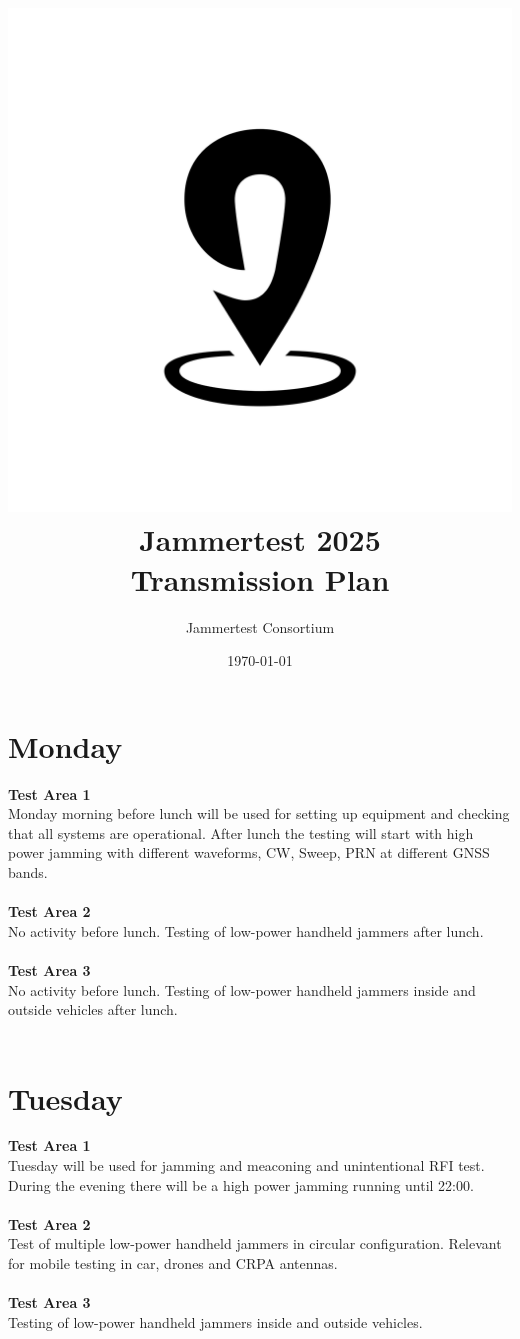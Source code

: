 \documentclass[a4paper]{book}
\title{\includegraphics[scale=0.2]{graphics/jampin.png}\\ Jammertest 2025 \\ \huge{Transmission Plan}}
\author{Jammertest Consortium}
\date{\today \\ \DTMcurrenttime}
\begin{document}
\maketitle

\tableofcontents
\restoregeometry

\begin{landscape}

\chapter{Monday}
\Large \textbf{Test Area 1} \\
Monday morning before lunch will be used for setting up equipment and checking that all systems are operational. After lunch the testing will start with high power jamming with different waveforms, CW, Sweep, PRN at different GNSS bands.\\ \\
\Large \textbf{Test Area 2} \\
No activity before lunch. Testing of low-power handheld jammers after lunch.\\ \\
\Large \textbf{Test Area 3} \\
No activity before lunch. Testing of low-power handheld jammers inside and outside vehicles after lunch.\\ \\

%

\chapter{Tuesday}
\Large \textbf{Test Area 1} \\
Tuesday will be used for jamming and meaconing and unintentional RFI test. During the evening there will be a high power jamming running until 22:00.\\ \\
\Large \textbf{Test Area 2} \\ 
Test of multiple low-power handheld jammers in circular configuration. Relevant for mobile testing in car, drones and CRPA antennas.\\ \\ 
\Large \textbf{Test Area 3} \\
Testing of low-power handheld jammers inside and outside vehicles.\\ \\

%


\end{landscape}
\end{document}
